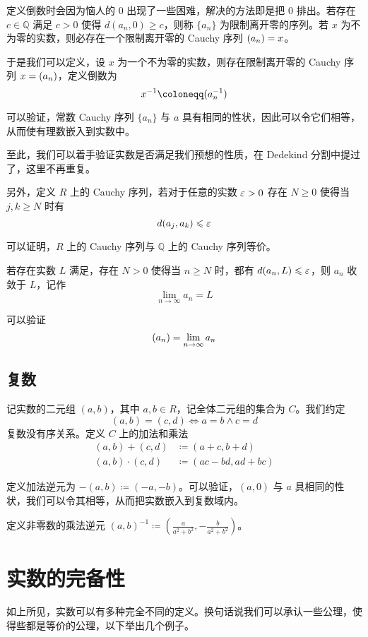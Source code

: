 定义倒数时会因为恼人的 $0$ 出现了一些困难，解决的方法即是把 $0$ 排出。若存在 $c\in \mathbb{Q}$ 满足 $c > 0$ 使得 $d(a_n,0) \geqslant c$，则称 $\{a_n\}$ 为限制离开零的序列。若 $x$ 为不为零的实数，则必存在一个限制离开零的 Cauchy 序列 $\LIM(a_n) = x$。

于是我们可以定义，设 $x$ 为一个不为零的实数，则存在限制离开零的 Cauchy 序列 $x=\LIM(a_n)$，定义倒数为
\[ x^{-1} \coloneqq  \LIM(a_n^{-1})\]

可以验证，常数 Cauchy 序列 $\{a_n\}$ 与 $a$ 具有相同的性状，因此可以令它们相等，从而使有理数嵌入到实数中。

至此，我们可以着手验证实数是否满足我们预想的性质，在 Dedekind 分割中提过了，这里不再重复。

另外，定义 $R$ 上的 Cauchy 序列，若对于任意的实数 $\varepsilon > 0$ 存在 $N \geqslant 0$ 使得当 $j,k \geqslant N$ 时有
\[ d(a_j,a_k) \leqslant \varepsilon\]

可以证明，$R$ 上的 Cauchy 序列与 $\mathbb{Q}$ 上的 Cauchy 序列等价。

若存在实数 $L$ 满足，存在 $N>0$ 使得当 $n \geqslant N$ 时，都有 $d(a_n,L) \leqslant \varepsilon$，则 $a_n$ 收敛于 $L$，记作
\[ \lim_{n\to \infty} a_n = L\]

可以验证
\[ \LIM(a_n) = \lim_{n\to \infty} a_n\]

\let\LIM\relax

\subsection{复数}

记实数的二元组 $(a,b)$，其中 $a,b\in R$，记全体二元组的集合为 $C$。我们约定
\[(a,b) = (c,d) \Leftrightarrow a=b \land  c=d\]
复数没有序关系。定义 $C$ 上的加法和乘法
\[\begin{aligned}
		(a,b) + (c,d)     & \coloneqq  (a+c,b+d)     \\
		(a,b) \cdot (c,d) & \coloneqq  (ac-bd,ad+bc)
	\end{aligned}\]

定义加法逆元为 $-(a,b) \coloneqq  (-a,-b)$。可以验证，$(a,0)$ 与 $a$ 具相同的性状，我们可以令其相等，从而把实数嵌入到复数域内。

定义非零数的乘法逆元 $(a,b)^{-1} \coloneqq  \left(\frac{a}{a^2+b^2},-\frac{b}{a^2+b^2}\right)$。

\section{实数的完备性}

如上所见，实数可以有多种完全不同的定义。换句话说我们可以承认一些公理，使得些都是等价的公理，以下举出几个例子。

